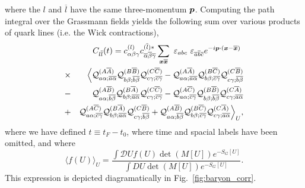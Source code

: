 where the $l$ and $\overline l$ have the same three-momentum $\boldsymbol{p}$. Computing the path integral over the Grassmann fields yields the following sum over various products of quark lines (i.e. the Wick contractions),
\begin{eqnarray*}
&&C_{l\overline{l}}(t)
= c^{(l)}_{\alpha\beta\gamma}
c^{(\overline{l})\ast}_{
\overline{\alpha}\overline{\beta}\overline{\gamma}}
\sum_{\boldsymbol{x}\overline{\boldsymbol{x}}}\ \varepsilon_{abc}
\   \varepsilon_{\overline{a}\overline{b}\overline{c}} 
e^{-i\boldsymbol{p}\cdot(\boldsymbol{x}-\overline{\boldsymbol{x}})}\  \nonumber\\
&\times& \Bigl\langle {\cal Q}^{(A\overline{A})}_{
a\alpha ;\overline{a}\overline{\alpha}}
{\cal Q}^{(B\overline{B})}_{b\beta ;\overline{b}\overline{\beta}}
{\cal Q}^{(C\overline{C})}_{c\gamma ;\overline{c}\overline{\gamma}}
-{\cal Q}^{(A\overline{A})}_{a\alpha;\overline{a}\overline{\alpha}}
{\cal Q}^{(B\overline{C})}_{b\beta   ;\overline{c}\overline{\gamma}}
{\cal Q}^{(C\overline{B})}_{c\gamma ;\overline{b}\overline{\beta}}
\nonumber\\
&-&{\cal Q}^{(A\overline{B})}_{a\alpha;\overline{b}\overline{\beta}}
{\cal Q}^{(B\overline{A})}_{b\beta  ;\overline{a}\overline{\alpha}}
{\cal Q}^{(C\overline{C})}_{c\gamma ;\overline{c}\overline{\gamma}}
- {\cal Q}^{(A\overline{C})}_{a\alpha;\overline{c}\overline{\gamma}}
{\cal Q}^{(B\overline{B})}_{b\beta ;\overline{b}\overline{\beta}}
{\cal Q}^{(C\overline{A})}_{c\gamma ;\overline{a}\overline{\alpha}}
\nonumber\\
&+&
{\cal Q}^{(A\overline{C})}_{a\alpha;\overline{c}\overline{\gamma}}
{\cal Q}^{(B\overline{A})}_{b\beta ;\overline{a}\overline{\alpha}}
{\cal Q}^{(C\overline{B})}_{c\gamma ;\overline{b}\overline{\beta}}
+{\cal Q}^{(A\overline{B})}_{a\alpha;\overline{b}\overline{\beta}}
{\cal Q}^{(B\overline{C})}_{b\beta ;\overline{c}\overline{\gamma}}
{\cal Q}^{(C\overline{A})}_{c\gamma ;\overline{a}\overline{\alpha}}
\Bigr\rangle_U,
\end{eqnarray*}
where we have defined $t\equiv t_F - t_0$, where time and spacial labels have been omitted, and where
\begin{equation}
    \langle f(U)\rangle_{U}=\frac{\int \mathcal{D} U f(U) \operatorname{det}(M[U]) e^{-S_{G}[U]}}{\int D U \operatorname{det}(M[U]) e^{-S_{G}[U]}}.
\end{equation}
This expression is depicted diagramatically in Fig.~\ref{fig:baryon_corr}.

